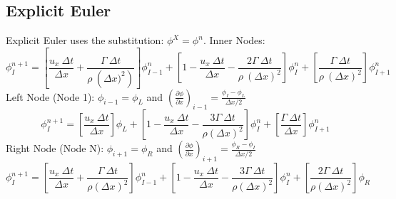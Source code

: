 \documentclass[12pt]{article}
\begin{document}
\subsection{Explicit Euler}
Explicit Euler uses the substitution: $\phi^{X} = \phi^{n}$.
Inner Nodes:
\begin{equation}
    \phi_{I}^{n+1} = \left[ \frac{u_x\: \Delta t}{\Delta x} + \frac{\Gamma\: \Delta t}{\rho\: \left(\Delta x)^2\right)} \right] \phi_{I-1}^{n} + \left[ 1 - \frac{u_x\: \Delta t}{\Delta x} - \frac{2\Gamma\: \Delta t}{\rho\: \left(\Delta x\right)^2} \right] \phi_{I}^{n} + \left[ \frac{\Gamma\:\Delta t}{\rho\: \left(\Delta x\right)^2} \right]\phi_{I+1}^{n}
    \label{eq:ee inner}
\end{equation}
Left Node (Node 1): $\phi_{i-1} = \phi_L$ and $\left( \frac{\partial \phi}{\partial x} \right)_{i-1} = \frac{\phi_I - \phi_L}{\Delta x/2}$
\begin{equation}
    \phi_{I}^{n+1} = \left[ \frac{u_x\: \Delta t}{\Delta x} \right]\phi_{L} + \left[ 1 - \frac{u_x\:\Delta t}{\Delta x} - \frac{3\Gamma\:\Delta t}{\rho\left(\Delta x\right)^2} \right]\phi_{I}^{n} + \left[ \frac{\Gamma\:\Delta t}{\Delta x} \right]\phi_{I+1}^{n}
    \label{eq:ee left}
\end{equation}
Right Node (Node N): $\phi_{i+1} = \phi_R$ and $\left( \frac{\partial \phi}{\partial x} \right)_{i+1} = \frac{\phi_R - \phi_I}{\Delta x/2}$
\begin{equation}
    \phi_{I}^{n+1} = \left[ \frac{u_x\:\Delta t}{\Delta x} + \frac{\Gamma\:\Delta t}{\rho\left(\Delta x\right)^2} \right]\phi_{I-1}^{n} + \left[ 1 - \frac{u_x\:\Delta t}{\Delta x} - \frac{3\Gamma\:\Delta t}{\rho\left(\Delta x\right)^2} \right]\phi_{I}^{n} + \left[ \frac{2\Gamma\:\Delta t}{\rho\left(\Delta x\right)^2} \right]\phi_{R}
    \label{eq:ee right}
\end{equation}
\end{document}
